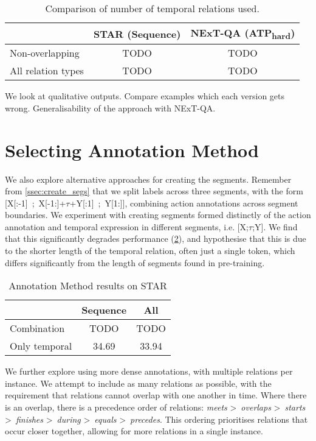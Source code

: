 \begin{table}[t]
	\centering
	\caption{Comparison of number of temporal relations used.}
	\label{tab:expandtemprel}
	\begin{tabular}{lcc}
		\toprule
		& STAR (Sequence) & NExT-QA (ATP\textsubscript{hard}) \\
		\midrule
		Non-overlapping & TODO & TODO \\
		All relation types & TODO & TODO \\
		\bottomrule
	\end{tabular}
\end{table}

We look at qualitative outputs. Compare examples which each version gets wrong.
Generalisability of the approach with NExT-QA.

\section{Selecting Annotation Method}
\label{sec:annot_method}

We also explore alternative approaches for creating the segments. Remember from
\cref{ssec:create_segs} that we split labels across three segments, with the
form \mbox{[X[:-1]~;~X[-1:]+$\tau$+Y[:1]~;~Y[1:]]}, combining action
annotations across segment boundaries. We experiment with creating segments
formed distinctly of the action annotation and temporal expression in different
segments, i.e. \mbox{[X;$\tau$;Y]}. We find that this significantly degrades
performance (\cref{tab:annot_method}), and hypothesise that this is due to the
shorter length of the temporal relation, often just a single token, which
differs significantly from the length of segments found in pre-training.

\begin{table}[t]
	\centering
	\caption{Annotation Method results on STAR}
	\label{tab:annot_method}
	\begin{tabular}{lcc}
		\toprule
		 & Sequence & All \\
		\midrule
		Combination & TODO & TODO \\
		Only temporal & 34.69 & 33.94 \\
		\bottomrule
	\end{tabular}
\end{table}


We further explore using more dense annotations, with multiple relations per
instance. We attempt to include as many relations as possible, with the
requirement that relations cannot overlap with one another in time.  Where
there is an overlap, there is a precedence order of relations: \textit{meets}
\textgreater~\textit{overlaps} \textgreater~\textit{starts}
\textgreater~\textit{finishes} \textgreater~\textit{during}
\textgreater~\textit{equals} \textgreater~\textit{precedes}. This ordering
prioritises relations that occur closer together, allowing for more relations
in a single instance.

